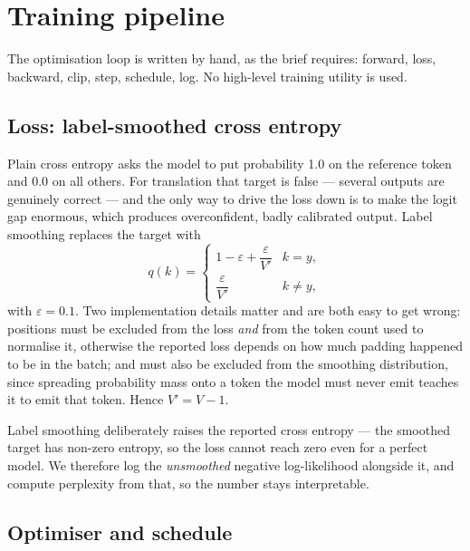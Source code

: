 \documentclass[11pt,a4paper]{article}
\begin{document}
\section{Training pipeline}
\label{sec:training}

The optimisation loop is written by hand, as the brief requires: forward, loss,
backward, clip, step, schedule, log. No high-level training utility is used.

\subsection{Loss: label-smoothed cross entropy}

Plain cross entropy asks the model to put probability 1.0 on the reference
token and 0.0 on all others. For translation that target is false --- several
outputs are genuinely correct --- and the only way to drive the loss down is to
make the logit gap enormous, which produces overconfident, badly calibrated
output. Label smoothing \cite{szegedy2016} replaces the target with
\begin{equation}
q(k) =
\begin{cases}
1 - \varepsilon + \dfrac{\varepsilon}{V'} & k = y, \\[8pt]
\dfrac{\varepsilon}{V'} & k \neq y,
\end{cases}
\end{equation}
with $\varepsilon = 0.1$. Two implementation details matter and are both easy
to get wrong:  positions must be excluded from the loss \emph{and}
from the token count used to normalise it, otherwise the reported loss depends
on how much padding happened to be in the batch; and  must also be
excluded from the smoothing distribution, since spreading probability mass onto
a token the model must never emit teaches it to emit that token. Hence $V' = V
- 1$.

Label smoothing deliberately raises the reported cross entropy --- the smoothed
target has non-zero entropy, so the loss cannot reach zero even for a perfect
model. We therefore log the \emph{unsmoothed} negative log-likelihood alongside
it, and compute perplexity from that, so the number stays interpretable.

\subsection{Optimiser and schedule}
\end{document}
